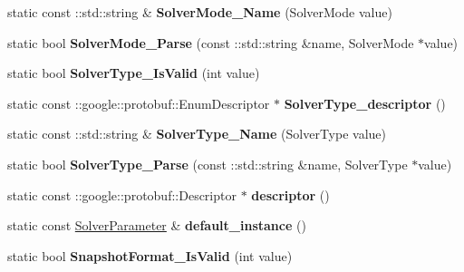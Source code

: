 \begin{DoxyCompactItemize}
static const \+::std\+::string \& {\bfseries Solver\+Mode\+\_\+\+Name} (Solver\+Mode value)
\item 
\mbox{\label{classcaffe_1_1_solver_parameter_a2ef716bd536999679076f27c907d2008}} 
static bool {\bfseries Solver\+Mode\+\_\+\+Parse} (const \+::std\+::string \&name, Solver\+Mode $\ast$value)
\item 
\mbox{\label{classcaffe_1_1_solver_parameter_a18f929a286e48a0a17729dc559b3f531}} 
static bool {\bfseries Solver\+Type\+\_\+\+Is\+Valid} (int value)
\item 
\mbox{\label{classcaffe_1_1_solver_parameter_af1ca40cbaabe8eea4a87aa5cd3ba0995}} 
static const \+::google\+::protobuf\+::\+Enum\+Descriptor $\ast$ {\bfseries Solver\+Type\+\_\+descriptor} ()
\item 
\mbox{\label{classcaffe_1_1_solver_parameter_a320632f19040a5f7a150d5cd5d9dee88}} 
static const \+::std\+::string \& {\bfseries Solver\+Type\+\_\+\+Name} (Solver\+Type value)
\item 
\mbox{\label{classcaffe_1_1_solver_parameter_a688973aee2890ddb744a70b812cff1c1}} 
static bool {\bfseries Solver\+Type\+\_\+\+Parse} (const \+::std\+::string \&name, Solver\+Type $\ast$value)
\item 
\mbox{\label{classcaffe_1_1_solver_parameter_a50416a24ff49581268ef6fe75e059dae}} 
static const \+::google\+::protobuf\+::\+Descriptor $\ast$ {\bfseries descriptor} ()
\item 
\mbox{\label{classcaffe_1_1_solver_parameter_a234fb3dfe11e3ebe0addd86f3a40af10}} 
static const \mbox{\hyperlink{classcaffe_1_1_solver_parameter}{Solver\+Parameter}} \& {\bfseries default\+\_\+instance} ()
\item 
\mbox{\label{classcaffe_1_1_solver_parameter_abbe9d4547c8c933385f4925894379225}} 
static bool {\bfseries Snapshot\+Format\+\_\+\+Is\+Valid} (int value)
\item 
\mbox{\label{classcaffe_1_1_solver_parameter_a6aa99b19a8b9f4e08388b967eab1a90a}} 

\end{DoxyCompactItemize}
